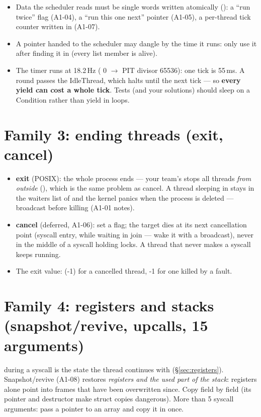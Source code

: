 \begin{itemize}
\item Data the scheduler reads must be single words written atomically ():
  a ``run twice'' flag (A1-04), a ``run this one next'' pointer (A1-05), a per-thread tick
  counter written in  (A1-07).
\item A pointer handed to the scheduler may dangle by the time it runs: only use it after finding
  it in  (every list member is alive).
\item The timer runs at 18.2\,Hz ( 0 $\to$ PIT divisor 65536): one tick
  is 55\,ms. A  round passes the IdleThread, which halts until the next tick ---
  so \textbf{every yield can cost a whole tick}. Tests (and your solutions) should sleep on a
  Condition rather than yield in loops.
\end{itemize}

\section{Family 3: ending threads (exit, cancel)}

\begin{itemize}
\item \textbf{exit} (POSIX): the whole process ends --- your team's  stops all
  threads \emph{from outside} (), which is the same problem as cancel. A thread
  sleeping in  stays in the waiters list of  and the
  kernel panics when the process is deleted --- broadcast before killing (A1-01 notes).
\item \textbf{cancel} (deferred, A1-06): set a flag; the target dies at its next cancellation point
  (syscall entry, while waiting in join --- wake it with a broadcast), never in the middle of a
  syscall holding locks. A thread that never makes a syscall keeps running.
\item The exit value:  (-1) for a cancelled thread, -1 for one killed by a fault.
\end{itemize}

\section{Family 4: registers and stacks (snapshot/revive, upcalls, 15 arguments)}

 during a syscall is the state the thread continues with (\S\ref{sec:registers}).
Snapshot/revive (A1-08) restores \emph{registers and the used part of the stack}: registers alone point
into frames that have been overwritten since. Copy  field by field (its
 pointer and destructor make struct copies dangerous). More than 5 syscall arguments: pass a
pointer to an array and copy it in once.

